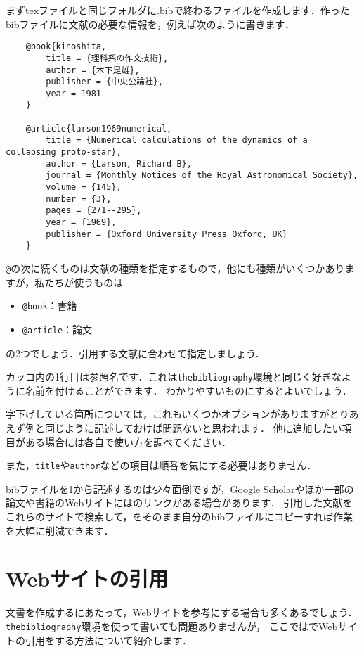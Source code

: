 \documentclass[a4paper,11pt]{ltjsreport}
\numberwithin{equation}{section}
\theoremstyle{definition}
\begin{document}
まずtexファイルと同じフォルダに.bibで終わるファイルを作成します．作ったbibファイルに文献の必要な情報を，例えば次のように書きます．
\begin{verbatim}
    @book{kinoshita,
        title = {理科系の作文技術},
        author = {木下是雄},
        publisher = {中央公論社},
        year = 1981
    }

    @article{larson1969numerical,
        title = {Numerical calculations of the dynamics of a collapsing proto-star},
        author = {Larson, Richard B},
        journal = {Monthly Notices of the Royal Astronomical Society},
        volume = {145},
        number = {3},
        pages = {271--295},
        year = {1969},
        publisher = {Oxford University Press Oxford, UK}
    }
\end{verbatim}

\verb|@|の次に続くものは文献の種類を指定するもので，他にも種類がいくつかありますが，私たちが使うものは
\begin{itemize}
    \item \verb|@book|：書籍
    \item \verb|@article|：論文
\end{itemize}
の2つでしょう．引用する文献に合わせて指定しましょう．

カッコ内の1行目は参照名です．これは\verb|thebibliography|環境と同じく好きなように名前を付けることができます．
わかりやすいものにするとよいでしょう．

字下げしている箇所については，これもいくつかオプションがありますがとりあえず例と同じように記述しておけば問題ないと思われます．
他に追加したい項目がある場合には各自で使い方を調べてください．

また，\verb|title|や\verb|author|などの項目は順番を気にする必要はありません．

bibファイルを1から記述するのは少々面倒ですが，Google Scholarやほか一部の論文や書籍のWebサイトには{\BibTeX}のリンクがある場合があります．
引用した文献をこれらのサイトで検索して，{\BibTeX}をそのまま自分のbibファイルにコピーすれば作業を大幅に削減できます．


\section{Webサイトの引用}

文書を作成するにあたって，Webサイトを参考にする場合も多くあるでしょう．\verb|thebibliography|環境を使って書いても問題ありませんが，
ここでは{\BibTeX}でWebサイトの引用をする方法について紹介します．
\end{document}
